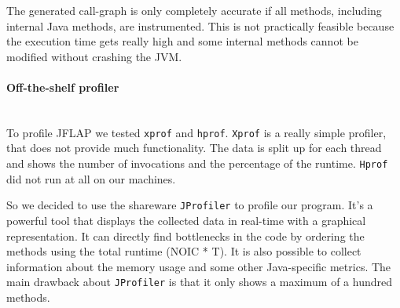 \documentclass{paper}
\begin{document}
The generated call-graph is only completely accurate if all methods, including internal Java methods, are instrumented. This is not practically feasible because the execution time gets really high and some internal methods cannot be modified without crashing the JVM.


\paragraph{Off-the-shelf profiler}\mbox{}\vspace{10pt}\\
To profile JFLAP we tested \texttt{xprof} and \texttt{hprof}. \texttt{Xprof} is a really simple profiler, that does not provide much functionality. The data is split up for each thread and shows the number of invocations and the percentage of the runtime. \texttt{Hprof} did not run at all on our machines.

So we decided to use the shareware \texttt{JProfiler} to profile our program. It's a powerful tool that displays the collected data in real-time with a graphical representation. It can directly find bottlenecks in the code by ordering the methods using the total runtime (NOIC * T). It is also possible to collect information about the memory usage and some other Java-specific metrics. The main drawback about \texttt{JProfiler} is that it only shows a maximum of a hundred methods.
\end{document}
